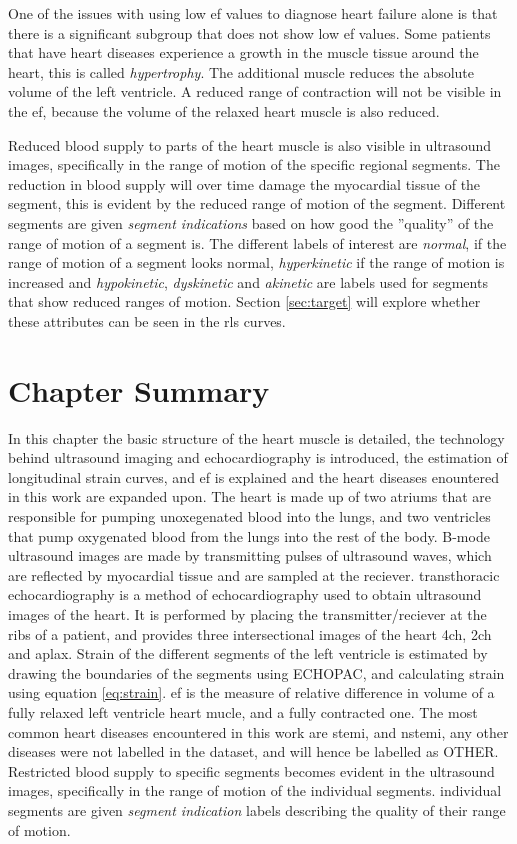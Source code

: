 One of the issues with using low \acrshort{ef} values to diagnose heart failure alone is that there is a significant subgroup that does not show low \acrshort{ef} values. Some patients that have heart diseases experience a growth in the muscle tissue around the heart, this is called \textit{hypertrophy}. The additional muscle reduces the absolute volume of the left ventricle. A reduced range of contraction will not be visible in the \acrshort{ef}, because the volume of the relaxed heart muscle is also reduced. \bigskip

Reduced blood supply to parts of the heart muscle is also visible in ultrasound images, specifically in the range of motion of the specific regional segments. The reduction in blood supply will over time damage the myocardial tissue of the segment, this is evident by the reduced range of motion of the segment. Different segments are given \textit{segment indications} based on how good the ''quality'' of the range of motion of a segment is. The different labels of interest are \textit{normal}, if the range of motion of a segment looks normal, \textit{hyperkinetic} if the range of motion is increased and \textit{hypokinetic}, \textit{dyskinetic} and \textit{akinetic} are labels used for segments that show reduced ranges of motion. Section \ref{sec:target} will explore whether these attributes can be seen in the \acrshort{rls} curves.

\section{Chapter Summary}

In this chapter the basic structure of the heart muscle is detailed, the technology behind ultrasound imaging and echocardiography is introduced, the estimation of longitudinal strain curves, and \acrshort{ef} is explained and the heart diseases enountered in this work are expanded upon. The heart is made up of two atriums that are responsible for pumping unoxegenated blood into the lungs, and two ventricles that pump oxygenated blood from the lungs into the rest of the body. B-mode ultrasound images are made by transmitting pulses of ultrasound waves, which are reflected by myocardial tissue and are sampled at the reciever. transthoracic echocardiography is a method of echocardiography used to obtain ultrasound images of the heart. It is performed by placing the transmitter/reciever at the ribs of a patient, and provides three intersectional images of the heart \acrshort{4ch}, \acrshort{2ch} and \acrshort{aplax}. Strain of the different segments of the left ventricle is estimated by drawing the boundaries of the segments using ECHOPAC, and calculating strain using equation \eqref{eq:strain}. \acrshort{ef} is the measure of relative difference in volume of a fully relaxed left ventricle heart mucle, and a fully contracted one. The most common heart diseases encountered in this work are \acrshort{stemi}, and \acrshort{nstemi}, any other diseases were not labelled in the dataset, and will hence be labelled as OTHER. Restricted blood supply to specific segments becomes evident in the ultrasound images, specifically in the range of motion of the individual segments. individual segments are given \textit{segment indication} labels describing the quality of their range of motion. 